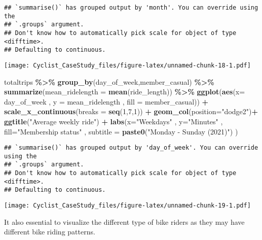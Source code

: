 \documentclass[
]{article}
\newenvironment{Shaded}{\begin{snugshade}}{\end{snugshade}}
\newcommand{\AttributeTok}[1]{\textcolor[rgb]{0.13,0.29,0.53}{#1}}
\newcommand{\DecValTok}[1]{\textcolor[rgb]{0.00,0.00,0.81}{#1}}
\newcommand{\FunctionTok}[1]{\textcolor[rgb]{0.13,0.29,0.53}{\textbf{#1}}}
\newcommand{\NormalTok}[1]{#1}
\newcommand{\SpecialCharTok}[1]{\textcolor[rgb]{0.81,0.36,0.00}{\textbf{#1}}}
\newcommand{\StringTok}[1]{\textcolor[rgb]{0.31,0.60,0.02}{#1}}
\begin{document}
\begin{verbatim}
## `summarise()` has grouped output by 'month'. You can override using the
## `.groups` argument.
## Don't know how to automatically pick scale for object of type <difftime>.
## Defaulting to continuous.
\end{verbatim}

\texttt{[image: Cyclist\_CaseStudy\_files/figure-latex/unnamed-chunk-18-1.pdf]}

\begin{Shaded}
\begin{Highlighting}[]
\NormalTok{totaltrips }\SpecialCharTok{\%\textgreater{}\%} \FunctionTok{group\_by}\NormalTok{(day\_of\_week,member\_casual) }\SpecialCharTok{\%\textgreater{}\%} \FunctionTok{summarize}\NormalTok{(}\AttributeTok{mean\_ridelength =} \FunctionTok{mean}\NormalTok{(ride\_length)) }\SpecialCharTok{\%\textgreater{}\%} \FunctionTok{ggplot}\NormalTok{(}\FunctionTok{aes}\NormalTok{(}\AttributeTok{x=}\NormalTok{ day\_of\_week , }\AttributeTok{y =}\NormalTok{ mean\_ridelength , }\AttributeTok{fill =}\NormalTok{ member\_casual)) }\SpecialCharTok{+} \FunctionTok{scale\_x\_continuous}\NormalTok{(}\AttributeTok{breaks =} \FunctionTok{seq}\NormalTok{(}\DecValTok{1}\NormalTok{,}\DecValTok{7}\NormalTok{,}\DecValTok{1}\NormalTok{)) }\SpecialCharTok{+} \FunctionTok{geom\_col}\NormalTok{(}\AttributeTok{position=}\StringTok{"dodge2"}\NormalTok{)}\SpecialCharTok{+} \FunctionTok{ggtitle}\NormalTok{(}\StringTok{"Average weekly ride"}\NormalTok{) }\SpecialCharTok{+} \FunctionTok{labs}\NormalTok{(}\AttributeTok{x=}\StringTok{"Weekdays"}\NormalTok{ , }\AttributeTok{y=}\StringTok{"Minutes"}\NormalTok{ , }\AttributeTok{fill=}\StringTok{"Membership status"}\NormalTok{ , }\AttributeTok{subtitle =} \FunctionTok{paste0}\NormalTok{(}\StringTok{"Monday {-} Sunday (2021)"}\NormalTok{) ) }
\end{Highlighting}
\end{Shaded}

\begin{verbatim}
## `summarise()` has grouped output by 'day_of_week'. You can override using the
## `.groups` argument.
## Don't know how to automatically pick scale for object of type <difftime>.
## Defaulting to continuous.
\end{verbatim}

\texttt{[image: Cyclist\_CaseStudy\_files/figure-latex/unnamed-chunk-19-1.pdf]}

It also essential to visualize the different type of bike riders as they
may have different bike riding patterns.
\end{document}
